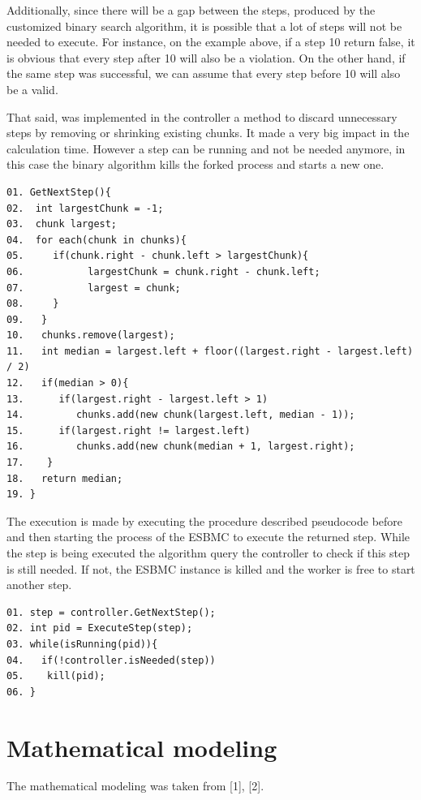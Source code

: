 Additionally, since there will be a gap between the steps, produced by the customized binary search algorithm, it is possible that a lot of steps will not be needed to execute. For instance, on the example above, if a step 10 return false, it is obvious that every step after 10 will also be a violation. On the other hand, if the same step was successful, we can assume that every step before 10 will also be a valid. 

That said, was implemented in the controller a method to discard unnecessary steps by removing or shrinking existing chunks. It made a very big impact in the calculation time. However a step can be running and not be needed anymore, in this case the binary algorithm kills the forked  process and starts a new one.
\begin{lstlisting}
01. GetNextStep(){
02.  int largestChunk = -1;
03.  chunk largest;
04.  for each(chunk in chunks){
05.     if(chunk.right - chunk.left > largestChunk){
06.           largestChunk = chunk.right - chunk.left;
07.           largest = chunk;
08.     }
09.   }	
10.   chunks.remove(largest);	
11.   int median = largest.left + floor((largest.right - largest.left) / 2)
12.   if(median > 0){
13.      if(largest.right - largest.left > 1)
14.         chunks.add(new chunk(largest.left, median - 1));	
15.      if(largest.right != largest.left)
16.         chunks.add(new chunk(median + 1, largest.right);
17.    }
18.   return median;
19. }
\end{lstlisting}
 The execution is made by executing the procedure described pseudocode before and then starting the process of the ESBMC to execute the returned step.
While the step is being executed the algorithm query the controller to check if this step is still needed. If not, the ESBMC instance is killed and the worker is free to start another step.

\begin{lstlisting}
01. step = controller.GetNextStep();
02. int pid = ExecuteStep(step);
03. while(isRunning(pid)){
04.   if(!controller.isNeeded(step))
05.    kill(pid);
06. }     
\end{lstlisting}

\section{Mathematical modeling}
The mathematical modeling was taken from [1], [2].
